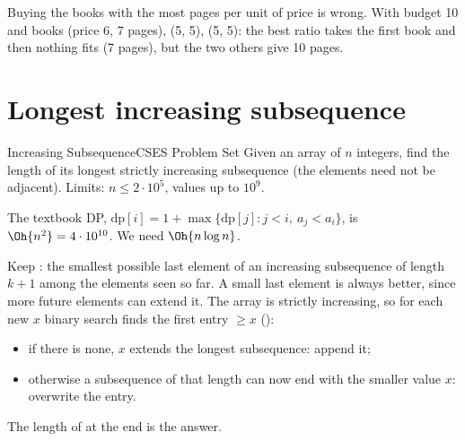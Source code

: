 \begin{pitfall}
Buying the books with the most pages per unit of price is wrong. With budget 10 and books (price 6, 7 pages), (5, 5),
(5, 5): the best ratio takes the first book and then nothing fits (7 pages), but the two others give 10 pages.
\end{pitfall}

\section[Longest increasing subsequence]{Longest increasing subsequence \hfill \gold}\label{wp:lis}

\begin{statement}{Increasing Subsequence}{CSES Problem Set}
Given an array of $n$ integers, find the length of its longest strictly increasing subsequence (the elements need not be
adjacent). Limits: $n \le 2\cdot 10^5$, values up to $10^9$.
\end{statement}

 The textbook DP, $\mathrm{dp}[i] = 1 + \max\{\mathrm{dp}[j] : j < i,\ a_j < a_i\}$, is
$\Oh{n^2} = 4\cdot10^{10}$. We need $\Oh{n\log n}$.

 Keep : the smallest possible last element of an increasing subsequence of length $k+1$
among the elements seen so far. A small last element is always better, since more future elements can extend it. The
array  is strictly increasing, so for each new $x$ binary search finds the first entry $\ge x$
():
\begin{itemize}
  \item if there is none, $x$ extends the longest subsequence: append it;
  \item otherwise a subsequence of that length can now end with the smaller value $x$: overwrite the entry.
\end{itemize}
The length of  at the end is the answer.

